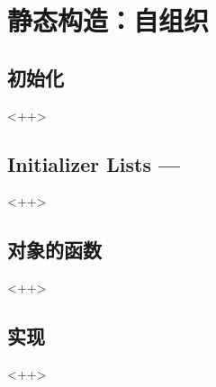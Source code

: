

\chapter{静态构造：自组织}
\label{ch:StaticConstruction}

\section{初始化}<++>

\section{Initializer Lists ---}<++>

\section{对象的函数}<++>

\section{实现}<++>

